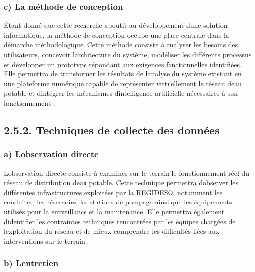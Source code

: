 \documentclass[12pt,a4paper,oneside]{report}
\begin{document}
\subsubsection{c) La méthode de
conception}\label{c-la-muxe9thode-de-conception}

Étant donné que cette recherche aboutit au développement
d\textquotesingle une solution informatique, la méthode de conception
occupe une place centrale dans la démarche méthodologique. Cette méthode
consiste à analyser les besoins des utilisateurs, concevoir
l\textquotesingle architecture du système, modéliser les différents
processus et développer un prototype répondant aux exigences
fonctionnelles identifiées. Elle permettra de transformer les résultats
de l\textquotesingle analyse du système existant en une plateforme
numérique capable de représenter virtuellement le réseau
d\textquotesingle eau potable et d\textquotesingle intégrer les
mécanismes d\textquotesingle intelligence artificielle nécessaires à son
fonctionnement \cite{ref106}.

\subsection{\texorpdfstring{\textbf{2.5.2. Techniques de collecte des
données}}{2.5.2. Techniques de collecte des données}}\label{techniques-de-collecte-des-donnuxe9es}

\subsubsection{a) L\textquotesingle observation
directe}\label{a-lobservation-directe}

L\textquotesingle observation directe consiste à examiner sur le terrain
le fonctionnement réel du réseau de distribution d\textquotesingle eau
potable. Cette technique permettra d\textquotesingle observer les
différentes infrastructures exploitées par la REGIDESO, notamment les
conduites, les réservoirs, les stations de pompage ainsi que les
équipements utilisés pour la surveillance et la maintenance. Elle
permettra également d\textquotesingle identifier les contraintes
techniques rencontrées par les équipes chargées de
l\textquotesingle exploitation du réseau et de mieux comprendre les
difficultés liées aux interventions sur le terrain \cite{ref110}.

\subsubsection{b) L\textquotesingle entretien}\label{b-lentretien}
\end{document}
